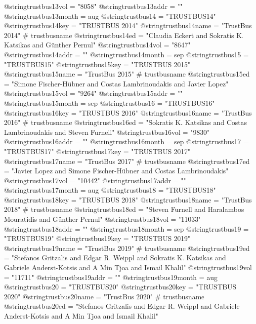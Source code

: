 @string{trustbus13vol =         "8058"}
@string{trustbus13addr =        ""}
@string{trustbus13month =       aug}
@string{trustbus14 =            "TRUSTBUS14"}
@string{trustbus14key =         "TRUSTBUS 2014"}
@string{trustbus14name =        "TrustBus 2014" # trustbusname}
@string{trustbus14ed =          "Claudia Eckert and Sokratis K. Katsikas and G{\"u}nther Pernul"}
@string{trustbus14vol =         "8647"}
@string{trustbus14addr =        ""}
@string{trustbus14month =       sep}
@string{trustbus15 =            "TRUSTBUS15"}
@string{trustbus15key =         "TRUSTBUS 2015"}
@string{trustbus15name =        "TrustBus 2015" # trustbusname}
@string{trustbus15ed =          "Simone Fischer-H{\"u}bner and Costas Lambrinoudakis and Javier Lopez"}
@string{trustbus15vol =         "9264"}
@string{trustbus15addr =        ""}
@string{trustbus15month =       sep}
@string{trustbus16 =            "TRUSTBUS16"}
@string{trustbus16key =         "TRUSTBUS 2016"}
@string{trustbus16name =        "TrustBus 2016" # trustbusname}
@string{trustbus16ed =          "Sokratis K. Katsikas and Costas Lambrinoudakis and Steven Furnell"}
@string{trustbus16vol =         "9830"}
@string{trustbus16addr =        ""}
@string{trustbus16month =       sep}
@string{trustbus17 =            "TRUSTBUS17"}
@string{trustbus17key =         "TRUSTBUS 2017"}
@string{trustbus17name =        "TrustBus 2017" # trustbusname}
@string{trustbus17ed =          "Javier Lopez and Simone Fischer-H{\"u}bner and Costas Lambrinoudakis"}
@string{trustbus17vol =         "10442"}
@string{trustbus17addr =        ""}
@string{trustbus17month =       aug}
@string{trustbus18 =            "TRUSTBUS18"}
@string{trustbus18key =         "TRUSTBUS 2018"}
@string{trustbus18name =        "TrustBus 2018" # trustbusname}
@string{trustbus18ed =          "Steven Furnell and Haralambos Mouratidis and G{\"u}nther Pernul"}
@string{trustbus18vol =         "11033"}
@string{trustbus18addr =        ""}
@string{trustbus18month =       sep}
@string{trustbus19 =            "TRUSTBUS19"}
@string{trustbus19key =         "TRUSTBUS 2019"}
@string{trustbus19name =        "TrustBus 2019" # trustbusname}
@string{trustbus19ed =          "Stefanos Gritzalis and Edgar R. Weippl and Sokratis K. Katsikas and Gabriele {Anderst-Kotsis} and A Min Tjoa and Ismail Khalil"}
@string{trustbus19vol =         "11711"}
@string{trustbus19addr =        ""}
@string{trustbus19month =       aug}
@string{trustbus20 =            "TRUSTBUS20"}
@string{trustbus20key =         "TRUSTBUS 2020"}
@string{trustbus20name =        "TrustBus 2020" # trustbusname}
@string{trustbus20ed =          "Stefanos Gritzalis and Edgar R. Weippl and Gabriele Anderst-Kotsis and A Min Tjoa and Ismail Khalil"}
